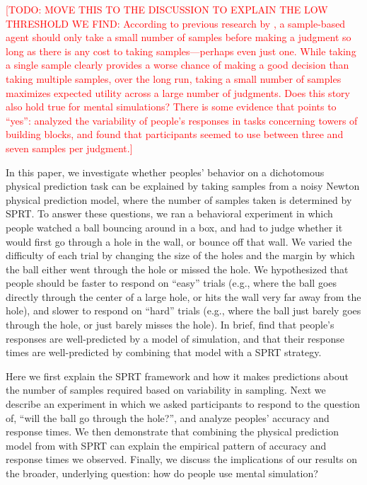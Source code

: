 \documentclass[10pt,letterpaper]{article}
\newcommand{\TODO}[1]{\textcolor{red}{[TODO: #1]}}
\begin{document}
\TODO{MOVE THIS TO THE DISCUSSION TO EXPLAIN THE LOW THRESHOLD WE FIND: According to previous research by \citeA{Vul:2014ba}, a sample-based agent should only take a small number of samples before making a judgment so long as there is any cost to taking samples---perhaps even just one. While taking a single sample clearly provides a worse chance of making a good decision than taking multiple samples, over the long run, taking a small number of samples maximizes expected utility across a large number of judgments. Does this story also hold true for mental simulations? There is some evidence that points to ``yes'': \citeA{Battaglia2013} analyzed the variability of people's responses in tasks concerning towers of building blocks, and found that participants seemed to use between three and seven samples per judgment.}

In this paper, we investigate whether peoples' behavior on a dichotomous physical prediction task can be explained by taking samples from a noisy Newton physical prediction model, where the number of samples taken is determined by SPRT. To answer these questions, we ran a behavioral experiment in which people watched a ball bouncing around in a box, and had to judge whether it would first go through a hole in the wall, or bounce off that wall. We varied the difficulty of each trial by changing the size of the holes and the margin by which the ball either went through the hole or missed the hole. We hypothesized that people should be faster to respond on ``easy'' trials (e.g., where the ball goes directly through the center of a large hole, or hits the wall very far away from the hole), and slower to respond on ``hard'' trials (e.g., where the ball just barely goes through the hole, or just barely misses the hole). In brief, find that people's responses are well-predicted by a model of simulation, and that their response times are well-predicted by combining that model with a SPRT strategy.

Here we first explain the SPRT framework and how it makes predictions about the number of samples required based on variability in sampling. Next we describe an experiment in which we asked participants to respond to the question of, ``will the ball go through the hole?'', and analyze peoples' accuracy and response times. We then demonstrate that combining the physical prediction model from  with SPRT can explain the empirical pattern of accuracy and response times we observed. Finally, we discuss the implications of our results on the broader, underlying question: how do people use mental simulation?
\end{document}
